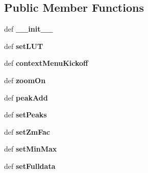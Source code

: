 \subsection*{Public Member Functions}
\begin{DoxyCompactItemize}
\item 
\hypertarget{classmyZmDisplay_1_1myZmDisplay_a54641fdc112a59527b6d8f449f7d37c7}{def {\bfseries \-\_\-\-\_\-init\-\_\-\-\_\-}}\label{classmyZmDisplay_1_1myZmDisplay_a54641fdc112a59527b6d8f449f7d37c7}

\item 
\hypertarget{classmyZmDisplay_1_1myZmDisplay_a217206bd5052930d7d07a909b65dcc0d}{def {\bfseries set\-L\-U\-T}}\label{classmyZmDisplay_1_1myZmDisplay_a217206bd5052930d7d07a909b65dcc0d}

\item 
\hypertarget{classmyZmDisplay_1_1myZmDisplay_a97423d0a9d494ceaed4dae284d3d8450}{def {\bfseries context\-Menu\-Kickoff}}\label{classmyZmDisplay_1_1myZmDisplay_a97423d0a9d494ceaed4dae284d3d8450}

\item 
\hypertarget{classmyZmDisplay_1_1myZmDisplay_a2a6f289f9c749b30a41afddd9a9ccff2}{def {\bfseries zoom\-On}}\label{classmyZmDisplay_1_1myZmDisplay_a2a6f289f9c749b30a41afddd9a9ccff2}

\item 
\hypertarget{classmyZmDisplay_1_1myZmDisplay_ae19086d7b292cb945ef88264dcb239e8}{def {\bfseries peak\-Add}}\label{classmyZmDisplay_1_1myZmDisplay_ae19086d7b292cb945ef88264dcb239e8}

\item 
\hypertarget{classmyZmDisplay_1_1myZmDisplay_abf543bfb38629b3ac50bb2077cab67cd}{def {\bfseries set\-Peaks}}\label{classmyZmDisplay_1_1myZmDisplay_abf543bfb38629b3ac50bb2077cab67cd}

\item 
\hypertarget{classmyZmDisplay_1_1myZmDisplay_acbc1fcd19eb140b6b08522900c66197b}{def {\bfseries set\-Zm\-Fac}}\label{classmyZmDisplay_1_1myZmDisplay_acbc1fcd19eb140b6b08522900c66197b}

\item 
\hypertarget{classmyZmDisplay_1_1myZmDisplay_a424cb82d1b5af9f171d41b6aa8b4f933}{def {\bfseries set\-Min\-Max}}\label{classmyZmDisplay_1_1myZmDisplay_a424cb82d1b5af9f171d41b6aa8b4f933}

\item 
\hypertarget{classmyZmDisplay_1_1myZmDisplay_a236a9fc1081d57f3e8c528be5114d2ca}{def {\bfseries set\-Fulldata}}\label{classmyZmDisplay_1_1myZmDisplay_a236a9fc1081d57f3e8c528be5114d2ca}


\end{DoxyCompactItemize}
